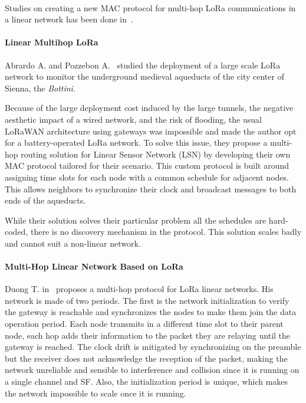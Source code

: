 \paragraph{}

Studies on creating a new MAC protocol for multi-hop LoRa communications in a linear
network has been done in~\cite{Abrardo_2019,duong2018}.

\paragraph{Linear Multihop LoRa}

Abrardo A. and Pozzebon A.~\cite{Abrardo_2019} studied the deployment of a
large scale LoRa network to monitor the underground medieval aqueducts of the city center
of Sienna, the \emph{Bottini}.

Because of the large deployment cost induced by the large tunnels, the negative
aesthetic impact of a wired network, and the risk of flooding,
the usual LoRaWAN architecture using gateways was impossible and made the author
opt for a battery-operated LoRa network.
To solve this issue, they propose a multi-hop routing solution for Linear Sensor
Network (LSN) by developing their own MAC protocol tailored for their scenario.
This custom protocol is built around assigning time slots for each node with
a common schedule for adjacent nodes.
This allows neighbors to synchronize their clock and broadcast messages to
both ends of the aqueducts.

While their solution solves their particular problem all the schedules are hard-coded,
there is no discovery mechanism in the protocol.
This solution scales badly and cannot suit a non-linear network.


\paragraph{Multi-Hop Linear Network Based on LoRa}

Duong T. in~\cite{duong2018} proposes a multi-hop protocol for LoRa linear
networks.
His network is made of two periods. The first is the network initialization to
verify the gateway is reachable and synchronizes the nodes to make them join the
data operation period.
Each node transmits in a different time slot to their parent node, each hop adds
their information to the packet they are relaying until the gateway is
reached.
The clock drift is mitigated by synchronizing on the preamble but the receiver
does not acknowledge the reception of the packet, making the network unreliable
and sensible to interference and collision since it is running on a
single channel and SF.
Also, the initialization period is unique, which makes the network impossible to
scale once it is running.

